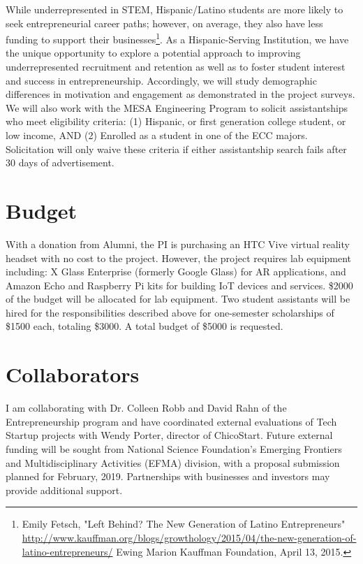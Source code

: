 \documentclass[letterpaper]{article}
\begin{document}
  While underrepresented in STEM, Hispanic/Latino students are more likely to seek entrepreneurial career paths; however, on average, they also have less funding to support their businesses\footnote{Emily Fetsch, "Left Behind? The New Generation of Latino Entrepreneurs" \url{http://www.kauffman.org/blogs/growthology/2015/04/the-new-generation-of-latino-entrepreneurs/} Ewing Marion Kauffman Foundation, April 13, 2015.}. As a Hispanic-Serving Institution, we have the unique opportunity to explore a potential approach to improving underrepresented recruitment and retention as well as to foster student interest and success in entrepreneurship. Accordingly, we will study demographic differences in motivation and engagement as demonstrated in the project surveys. We will also work with the MESA Engineering Program to solicit assistantships who meet eligibility criteria: (1) Hispanic, or first generation college student, or low income, AND (2) Enrolled as a student in one of the ECC majors. Solicitation will only waive these criteria if either assistantship search fails after 30 days of advertisement.

  \section{Budget}
  With a donation from Alumni, the PI is purchasing an HTC Vive virtual reality headset with no cost to the project. However, the project requires lab equipment including: X Glass Enterprise (formerly Google Glass) for AR applications,  and Amazon Echo and Raspberry Pi kits for building IoT devices and services. \$2000 of the budget will be allocated for lab equipment. Two student assistants will be hired for the responsibilities described above for one-semester scholarships of \$1500 each, totaling \$3000. A total budget of \$5000 is requested.

  \section{Collaborators}
  I am collaborating with Dr. Colleen Robb and David Rahn of the Entrepreneurship program and have coordinated external evaluations of Tech Startup projects with Wendy Porter, director of ChicoStart. Future external funding will be sought from National Science Foundation's Emerging Frontiers and Multidisciplinary Activities (EFMA) division, with a proposal submission planned for February, 2019. Partnerships with businesses and investors may provide additional support.
\end{document}
